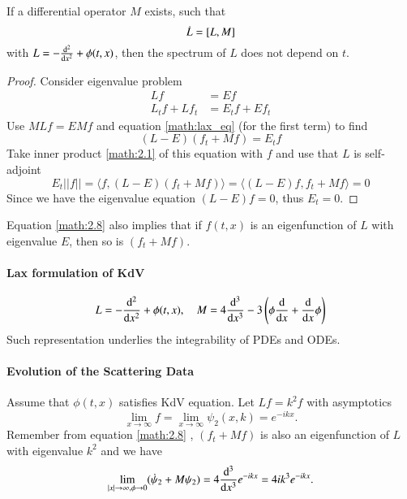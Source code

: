 \begin{prop}
If a differential operator $M$ exists, such that
\begin{equation}
	\dot{L} = \comm{L}{M}
	\label{math:lax_eq}
\end{equation}
with $L = -\dv[2]{x} + \phi(t, x)$, then the spectrum of $L$ does not depend on $t$.
\end{prop}

\begin{proof}
Consider eigenvalue problem
\begin{align*}
	L f &= Ef \\
	L_t f + L f_t &= E_t f + E f_t
\end{align*}
Use $ML f = E M f$ and equation \eqref{math:lax_eq} (for the first term) to find
\begin{equation}
	(L-E) (f_t + Mf) = E_t f
	\label{math:2.8}
\end{equation}
Take inner product \eqref{math:2.1} of this equation with  $f$ and use that $L$ is self-adjoint
\begin{equation*}
	E_t ||f|| = \langle f, (L-E) (f_t + Mf) \rangle = \langle (L-E) f, f_t + Mf \rangle = 0
	\label{math:2.9}
\end{equation*}
Since we have the eigenvalue equation $(L-E) f = 0$, thus $E_t = 0$.
\end{proof}

Equation \eqref{math:2.8} also implies that if $f(t, x)$ is an eigenfunction of $L$ with eigenvalue $E$, then so is $(f_t + Mf)$.

\paragraph{Lax formulation of KdV}
\begin{equation}
	L = - \dv[2]{x} + \phi(t, x), \quad M = 4 \dv[3]{x} - 3 \left( \phi \dv{x} + \dv{x} \phi \right) 
\end{equation}
Such representation underlies the integrability of PDEs and ODEs.

\paragraph{Evolution of the Scattering Data} 
Assume that $\phi(t, x)$ satisfies KdV equation. Let $L f = k^2 f$ with asymptotics 
\begin{equation*}
	\lim_{x\rightarrow \infty} f = \lim_{x\rightarrow \infty} \psi_2 (x, k) = e^{-ikx} .
\end{equation*}
Remember from equation \eqref{math:2.8} , $(f_t + Mf)$ is also an eigenfunction of $L$ with eigenvalue $k^2$ and we have  
\begin{equation*}
	\lim_{|x|\rightarrow \infty, \phi \rightarrow 0} (\dot{\psi}_2 + M\psi_2) = 4 \dv[3]{x} e^{-ikx} = 4 ik^3 e^{-ikx}.
\end{equation*}

